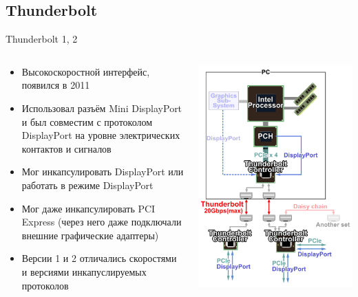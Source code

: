 \documentclass[xetex,aspectratio=43]{beamer}
\begin{document}
\subsection{Thunderbolt}

\begin{frame}{Thunderbolt 1, 2}
    \begin{columns}
        \begin{column}{0.5\textwidth}
            \begin{itemize}
                \item Высокоскоростной интерфейс, появился в 2011
                \item Использовал разъём Mini DisplayPort и был совместим с протоколом DisplayPort на уровне электрических контактов и сигналов
                \item Мог инкапсулировать DisplayPort или работать в режиме DisplayPort
                \item \alert{Мог даже инкапсулировать PCI Express} (через него даже подключали внешние графические адаптеры)
                \item Версии 1 и 2 отличались скоростями и версиями инкапуслируемых протоколов
            \end{itemize}
        \end{column}
        \begin{column}{0.5\textwidth}
            \includegraphics[height=0.8\textheight]{img/04.Thunderbolt_1.png}

\end{column}
\end{columns}
\end{frame}
\end{document}
